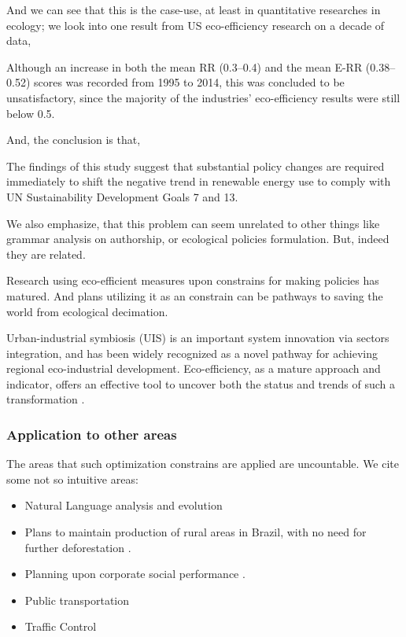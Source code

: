 \documentclass[
12pt,				%
openright,			%
oneside,			%
a4paper,			%
brazil,				%
english,			%
]{abntex2}
\begin{document}
And we can see that this is the case-use, at least in quantitative
researches in ecology; we look into one result from US eco-efficiency research on a decade of data,

\begin{citacao}
 Although an increase in both the mean RR (0.3–0.4) and the mean E-RR
 (0.38–0.52) scores was recorded from 1995 to 2014, this was concluded
 to be unsatisfactory, since the majority of the industries’
 eco-efficiency results were still below 0.5. \cite{ezici2020assessing}
\end{citacao}

And, the conclusion is that,

\begin{citacao}
The findings of this study suggest that substantial policy changes are
required immediately to shift the negative trend in renewable energy
use to comply with UN Sustainability Development Goals 7 and 13. \cite{ezici2020assessing}
\end{citacao}



We also emphasize, that this problem can seem unrelated to other
things like grammar analysis on authorship, or ecological policies
formulation. But, indeed they are related. 

Research using eco-efficient measures upon constrains for making
policies has matured. And plans utilizing it as an constrain can be
pathways to saving the world from ecological decimation.

\begin{citacao}
Urban-industrial symbiosis (UIS) is an important system innovation via
sectors integration, and has been widely recognized as a novel pathway
for achieving regional eco-industrial development. Eco-efficiency, as
a mature approach and indicator, offers an effective tool to uncover
both the status and trends of such a transformation \cite{bian2020sectoral}.
\end{citacao}

\subsubsection{Application to other areas}

The areas that such optimization constrains are applied are
uncountable. We cite some not so intuitive areas:

\begin{itemize}
\item Natural Language analysis and evolution \cite{potts2010harmonic,
  heinz2018computational}
\item Plans to maintain production of rural areas in Brazil, with no
  need for further deforestation \cite{costa2018socio}.
\item Planning upon corporate social performance
  \cite{chen2011measuring,jacobs2016operational}.
\item Public transportation \cite{schiewe2020integrated} 
\item Traffic Control \cite{delle2019feedback}
\end{itemize}
\end{document}
